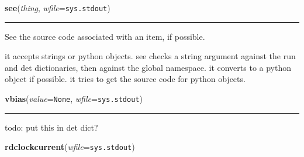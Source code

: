     \begin{boxedminipage}{\textwidth}

    \raggedright \textbf{see}(\textit{thing}, \textit{wfile}=\texttt{sys.stdout})

    \vspace{-1.5ex}

    \rule{\textwidth}{0.5\fboxrule}
    See the source code associated with an item, if possible.

    it accepts strings or python objects. see checks a string argument 
    against the run and det dictionaries, then against the global 
    namespace. it converts to a python object if possible. it tries to get 
    the source code for python objects.

    \vspace{1ex}

    \end{boxedminipage}

    \label{words:vbias}

    \vspace{0.5ex}

    \begin{boxedminipage}{\textwidth}

    \raggedright \textbf{vbias}(\textit{value}=\texttt{None}, \textit{wfile}=\texttt{sys.stdout})

    \vspace{-1.5ex}

    \rule{\textwidth}{0.5\fboxrule}
    todo: put this in det dict?

    \vspace{1ex}

    \end{boxedminipage}

    \label{words:rdclockcurrent}

    \vspace{0.5ex}

    \begin{boxedminipage}{\textwidth}

    \raggedright \textbf{rdclockcurrent}(\textit{wfile}=\texttt{sys.stdout})

    \end{boxedminipage}

    \label{words:rdclockrail}


